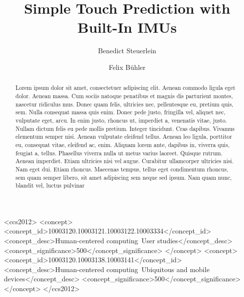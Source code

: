 \documentclass[sigchi-a, authorversion,table]{acmart}
\begin{document}
\title{Simple Touch Prediction with Built-In IMUs}

\author{Benedict Steuerlein}

\author{Felix Bühler}


\renewcommand{\shortauthors}{F. Author et al.}


%
%


\begin{CCSXML}
<ccs2012>
 <concept>
<concept_id>10003120.10003121.10003122.10003334</concept_id>
<concept_desc>Human-centered computing~User studies</concept_desc>
<concept_significance>500</concept_significance>
</concept>
<concept>
<concept_id>10003120.10003138.10003141</concept_id>
<concept_desc>Human-centered computing~Ubiquitous and mobile devices</concept_desc>
<concept_significance>500</concept_significance>
</concept>
</ccs2012>
\end{CCSXML}

\begin{abstract}
Lorem ipsum dolor sit amet, consectetuer adipiscing elit. Aenean commodo ligula eget dolor. Aenean massa. Cum sociis natoque penatibus et magnis dis parturient montes, nascetur ridiculus mus. Donec quam felis, ultricies nec, pellentesque eu, pretium quis, sem. Nulla consequat massa quis enim. Donec pede justo, fringilla vel, aliquet nec, vulputate eget, arcu. In enim justo, rhoncus ut, imperdiet a, venenatis vitae, justo. Nullam dictum felis eu pede mollis pretium. Integer tincidunt. Cras dapibus. Vivamus elementum semper nisi. Aenean vulputate eleifend tellus. Aenean leo ligula, porttitor eu, consequat vitae, eleifend ac, enim. Aliquam lorem ante, dapibus in, viverra quis, feugiat a, tellus. Phasellus viverra nulla ut metus varius laoreet. Quisque rutrum. Aenean imperdiet. Etiam ultricies nisi vel augue. Curabitur ullamcorper ultricies nisi. Nam eget dui. Etiam rhoncus. Maecenas tempus, tellus eget condimentum rhoncus, sem quam semper libero, sit amet adipiscing sem neque sed ipsum. Nam quam nunc, blandit vel, luctus pulvinar
\end{abstract}
\end{document}

